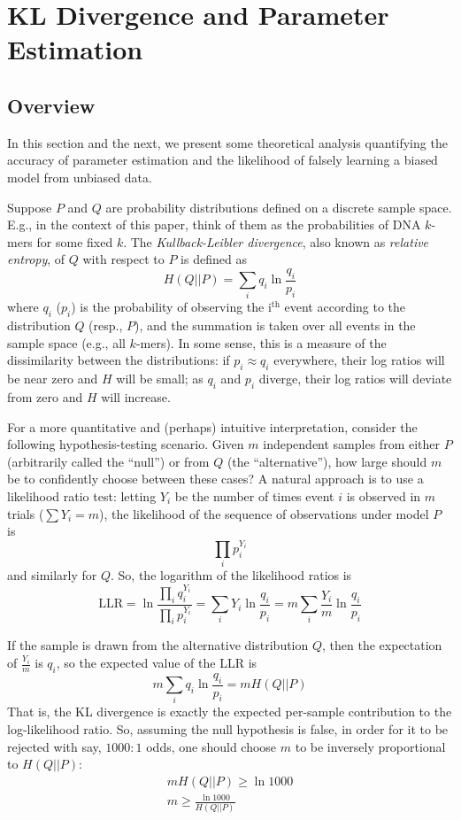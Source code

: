 \documentclass[letterpaper]{article}
\begin{document}
\section{KL Divergence and Parameter Estimation}

\subsection{Overview}

In this section and the next, we present some theoretical analysis quantifying
the accuracy of parameter estimation and the likelihood of falsely learning a
biased model from unbiased data.

Suppose $P$ and $Q$ are probability distributions defined on a discrete sample
space. E.g., in the context of this paper, think of them as the probabilities of
DNA $k$-mers for some fixed $k$. The \emph{Kullback-Leibler divergence}, also
known as \emph{relative entropy}, of $Q$ with respect to $P$ is defined as
$$H(Q||P) = \sum_{i} q_i \ln \frac{q_{i}}{p_{i}}$$
where $q_{i}$ ($p_{i}$) is the probability of observing the i$^{\text{th}}$
event according to the distribution $Q$ (resp., $P$), and the summation is taken
over all events in the sample space (e.g., all $k$-mers). In some sense, this is
a measure of the dissimilarity between the distributions: if $p_{i} \approx
q_{i}$ everywhere, their log ratios will be near zero and $H$ will be small; as
$q_{i}$ and $p_{i}$ diverge, their log ratios will deviate from zero and $H$
will increase.

For a more quantitative and (perhaps) intuitive interpretation, consider the
following hypothesis-testing scenario. Given $m$ independent samples from either
$P$ (arbitrarily called the ``null'') or from $Q$ (the ``alternative''), how
large should $m$ be to confidently choose between these cases? A natural
approach is to use a likelihood ratio test: letting $Y_i$ be the number of times
event $i$ is observed in $m$ trials ($\sum Y_i = m$), the likelihood of the
sequence of observations under model $P$ is $$\prod_{i} p_{i}^{Y_{i}}$$
and similarly for $Q$. So, the logarithm of the likelihood ratios is
$$
\text{LLR} =
\ln \frac{\prod_{i} q_{i} ^ {Y_{i}}}{\prod_{i} p_{i} ^ {Y_{i}}}
= \sum_{i} Y_{i} \ln \frac{q_{i}}{p_{i}}
= m \sum_{i} \frac{Y_{i}}{m} \ln \frac{q_{i}}{p_{i}} $$

If the sample is drawn from the alternative distribution $Q$, then the
expectation of $\frac{Y_{i}}{m}$ is $q_i$, so the expected value of the LLR is
$$ m \sum_{i} q_{i} \ln \frac{q_{i}}{p_{i}} = m H(Q || P) $$
That is, the KL divergence is exactly the expected per-sample contribution to
the log-likelihood ratio.
So, assuming the null hypothesis is false, in order for it to be rejected with
say, $1000:1$ odds, one should choose $m$ to be inversely proportional to $H(Q ||
P)$:
\begin{align*}
m H(Q||P) \ge \ln 1000 \\
m \ge \frac{\ln 1000}{H(Q || P)}
\end{align*}
\end{document}
